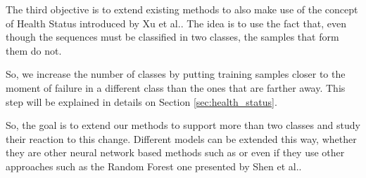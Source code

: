 The third objective is to extend existing methods to also make use of the concept of Health Status introduced by Xu et al.\cite{Xu16}.
The idea is to use the fact that, even though the sequences must be classified in two classes, the samples that form them do not.

So, we increase the number of classes by putting training samples closer to the moment of failure in a different class than the ones that are farther away.
This step will be explained in details on Section \ref{sec:health_status}.

So, the goal is to extend our methods to support more than two classes and study their reaction to this change.
Different models can be extended this way, whether they are other neural network based methods such as \cite{Zhu13} or even if they use other approaches such as the Random Forest one presented by Shen et al.\cite{Shen18}.  